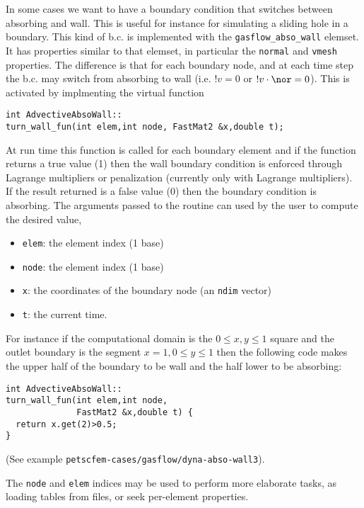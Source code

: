 \let\verbb=\Verb


In some cases we want to have a boundary condition that switches
between absorbing and wall. This is useful for instance for simulating
a sliding hole in a boundary. This kind of b.c. is implemented with
the \verbb+gasflow_abso_wall+ elemset. It has properties similar to
that elemset, in particular the \verbb+normal+ and \verbb+vmesh+
properties. The difference is that for each boundary node, and at each
time step the b.c. may switch from absorbing to wall
(i.e. $!v=0$ or $!v\cdot\nor=0$). This is activated by implmenting the
virtual function 

\medskip
\begin{Verbatim}
int AdvectiveAbsoWall::
turn_wall_fun(int elem,int node, FastMat2 &x,double t);
\end{Verbatim}
\medskip

At run time this function is called for each boundary element and if
the function returns a true value (1) then the wall boundary condition
is enforced through Lagrange multipliers or penalization (currently
only with Lagrange multipliers). If the result returned is a false
value (0) then the boundary condition is absorbing. 
The arguments passed to the routine can used by the user to compute
the desired value, 
%
\begin{itemize}
\compactlist 
\item \verbb+elem+: the element index (1 base)
\item \verbb+node+: the element index (1 base)
\item \verbb+x+: the coordinates of the boundary node (an \verbb+ndim+
  vector) 
\item \verbb+t+: the current time. 
\end{itemize}
 
For instance if the computational domain is the $0\le x,y\le 1$ square
and the outlet boundary is the segment $x=1, 0\le y\le 1$ then the
following code makes the upper half of the boundary to be wall and the
half lower to be absorbing:

\medskip
\begin{Verbatim}
int AdvectiveAbsoWall::
turn_wall_fun(int elem,int node,
              FastMat2 &x,double t) {
  return x.get(2)>0.5;
}
\end{Verbatim}
\medskip

(See example \verbb+petscfem-cases/gasflow/dyna-abso-wall3+). 

The \verbb+node+ and \verbb+elem+ indices may be used to perform more
elaborate tasks, as loading tables from files, or seek per-element
properties. 


\begin{itemize}

\end{itemize}

